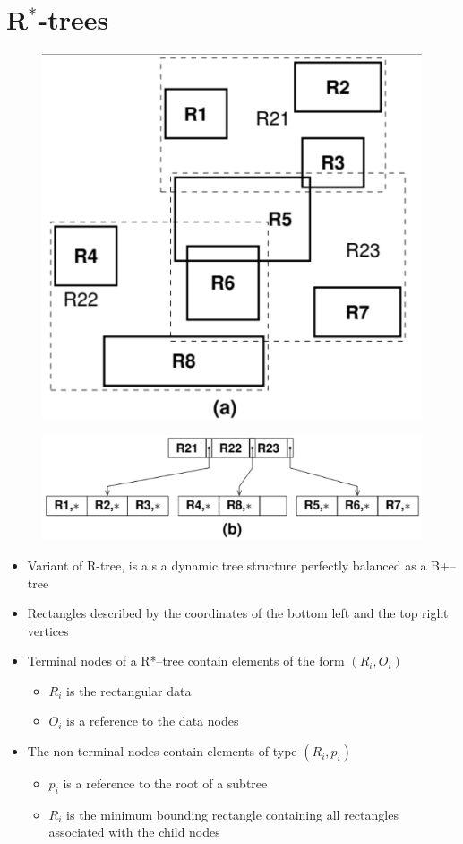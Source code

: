 \newpage
\section{R$^*$-trees}
\begin{figure}[h]
\centering
\includegraphics[width=.4\linewidth]{images/DBMS_Internals/MultiDimensionalDataOrganizations/r+tree1.jpeg}
\end{figure}
\begin{figure}[h]
\centering
\includegraphics[width=.8\linewidth]{images/DBMS_Internals/MultiDimensionalDataOrganizations/r+tree.jpeg}
\end{figure}
\begin{itemize}
    \item Variant of R-tree, is a s a dynamic tree structure perfectly balanced as a B+–tree
    \item Rectangles described by the coordinates of the bottom left and the top right vertices
    \item Terminal nodes of a R*–tree contain elements of the form $(R_i, O_i)$
    \begin{itemize}
        \item $R_i$ is the rectangular data
        \item $O_i$ is a reference to the data nodes
    \end{itemize}
    \item The non-terminal nodes contain elements of type $(R_i, p_i)$
    \begin{itemize}
        \item $p_i$ is a reference to the root of a subtree
        \item $R_i$ is the minimum bounding rectangle containing all rectangles associated with the child nodes
    \end{itemize}
\end{itemize}



